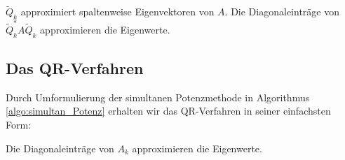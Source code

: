 \documentclass[
]{mycourse}
\theoremstyle{mythm}
\theoremstyle{break}
\begin{document}
\begin{alg}
\label{algo:simultan_Potenz}
\begin{algorithmic}
\EndFor
\State \Return $\tilde Q_k$ approximiert spaltenweise Eigenvektoren von $A$. Die Diagonaleinträge von $\tilde Q_k^* A \tilde Q_k$ approximieren die Eigenwerte.
\end{algorithmic}
\end{alg}

\subsection{Das QR-Verfahren}

Durch Umformulierung der simultanen Potenzmethode in Algorithmus \ref{algo:simultan_Potenz} erhalten wir das QR-Verfahren in seiner einfachsten Form:

\begin{alg}[$QR$-Verfahren]
\label{algo:QR_Eigenwerte}
\begin{algorithmic}
\EndFor
\State \Return Die Diagonaleinträge von $A_k$ approximieren die Eigenwerte.
\end{algorithmic}
\end{alg}
\end{document}

